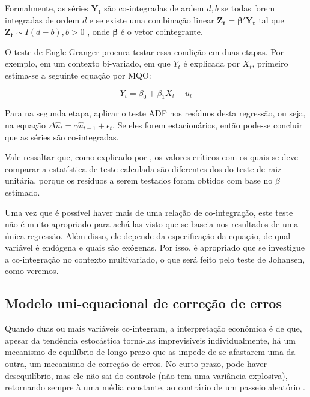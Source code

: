 \documentclass[a4paper,
               article,
               12pt,
               openany,
               oneside,
               english,
               brazil]{abntex2}
\numberwithin{equation}{section}
\begin{document}
    Formalmente, as séries $ \mathbf{Y_t} $ são co-integradas de ardem $ d, b $ se todas forem integradas de ordem $ d $ e se existe uma combinação linear $ \mathbf{Z_t} = \pmb{\beta}'\mathbf{Y_t} $ tal que $ \mathbf{Z_t} \sim I(d - b), b > 0 $ \cite[p.~245]{lutkepool}, onde $ \pmb{\beta} $ é o vetor cointegrante.

    O teste de Engle-Granger procura testar essa condição em duas etapas. Por exemplo, em um contexto bi-variado, em que $ Y_t $ é explicada por $ X_t $, primeiro estima-se a seguinte equação por MQO:

    \begin{equation}
        Y_t = \beta_0 + \beta_1 X_t + u_t \label{engle-granger}
    \end{equation}

    Para na segunda etapa, aplicar o teste ADF nos resíduos desta regressão, ou seja, na equação $ \Delta \hat{u}_t = \gamma \hat{u}_{t-1} + \epsilon_{t} $. Se eles forem estacionários, então pode-se concluir que as séries são co-integradas.

    Vale ressaltar que, como explicado por \textcite[p.~756]{gujarati}, os valores críticos com os quais se deve comparar a estatística de teste calculada são diferentes dos do teste de raiz unitária, porque os resíduos a serem testados foram obtidos com base no $ \beta $ estimado.

    Uma vez que é possível haver mais de uma relação de co-integração, este teste não é muito apropriado para achá-las visto que se baseia nos resultados de uma única regressão. Além disso, ele depende da especificação da equação, de qual variável é endógena e quais são exógenas. Por isso, é apropriado que se investigue a co-integração no contexto multivariado, o que será feito pelo teste de Johansen, como veremos.

    \subsection{Modelo uni-equacional de correção de erros}

    Quando duas ou mais variáveis co-integram, a interpretação econômica é de que, apesar da tendência estocástica torná-las imprevisíveis individualmente, há um mecanismo de equilíbrio de longo prazo que as impede de se afastarem uma da outra, um mecanismo de correção de erros. No curto prazo, pode haver desequilíbrio, mas ele não sai do controle (não tem uma variância explosiva), retornando sempre à uma média constante, ao contrário de um passeio aleatório \textcite[757-758]{gujarati}.
\end{document}
